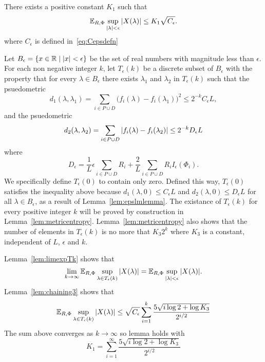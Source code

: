 \documentclass[journal]{IEEEtran}
\begin{document}
\begin{lemma}\label{lem:chaining2}
There exists a positive constant $K_1$ such that
\[
{\mathbb E}_{R,\Phi} \sup_{{\vert \lambda \vert} < \epsilon} {\left\vert  X(\lambda)  \right\vert} \leq K_1 \sqrt{C_\epsilon}.
\]
where $C_\epsilon$ is defined in~\eqref{eq:Cepsdefn}
\end{lemma}
\begin{IEEEproof}
Let $B_\epsilon = \{x \in {\mathbb R} \mid {\left\vert x \right\vert} < \epsilon\}$ be the set of real numbers with magnitude less than $\epsilon$.  For each non negative integer $k$, let $T_\epsilon(k)$ be a discrete subset of $B_\epsilon$ with the property that for every $\lambda \in B_\epsilon$ there exists $\lambda_1$ and $\lambda_2$ in $T_\epsilon(k)$ such that the psuedometric
\[
d_1(\lambda, \lambda_1) = \sum_{i \in P \cup D} \big( f_{i}(\lambda) - f_{i}(\lambda_1) \big)^2 \leq 2^{-k} C_\epsilon L,
\]
and the psuedometric
\[
d_2(\lambda, \lambda_2) = \sum_{i \in P \cup D} {\vert f_{i}(\lambda) - f_{i}(\lambda_2) \vert} \leq 2^{-k} D_\epsilon L
\]
where 
\begin{equation}\label{eq:Depsdefn}
D_\epsilon = \frac{1}{L}\epsilon\sum_{i\in P \cup D}R_i + \frac{2}{L}\sum_{i\in P \cup D}R_i I_{\epsilon}(\Phi_i).
\end{equation}
We specifically define $T_\epsilon(0)$ to contain only zero.  Defined this way, $T_\epsilon(0)$ satisfies the inequality above because $d_1(\lambda, 0) \leq C_\epsilon L $ and $d_2(\lambda, 0) \leq D_\epsilon L$ for all $\lambda \in B_\epsilon$, as a result of Lemma~\ref{lem:epslmlemma}.  
The existance of $T_\epsilon(k)$ for every positive integer $k$ will be proved by construction in Lemma~\ref{lem:metricentropy}.  Lemma~\ref{lem:metricentropy} also shows that the number of elements in $T_\epsilon(k)$ is no more that $K_3 2^k$ where $K_3$ is a constant, independent of $L$, $\epsilon$ and $k$.

Lemma~\ref{lem:limexpTk} shows that
\[
\lim_{k\rightarrow\infty}{\mathbb E}_{R,\Phi}\sup_{\lambda \in T_\epsilon(k)} {\vert X(\lambda) \vert} = {\mathbb E}_{R,\Phi} \sup_{{\vert \lambda \vert} < \epsilon} {\vert X(\lambda) \vert}.
\]
Lemma~\ref{lem:chaining3} shows that
\[
{\mathbb E}_{R,\Phi} \sup_{\lambda \in T_\epsilon(k)} {\vert X(\lambda) \vert} \leq \sqrt{C_\epsilon} \sum_{i=1}^k \frac{5\sqrt{i \log 2 + \log K_3}}{2^{i/2}}
\]
The sum above converges as $k\rightarrow\infty$ so lemma holds with
\[
K_1 = \sum_{i=1}^\infty \frac{5\sqrt{i \log 2 + \log K_3}}{2^{i/2}}
\]
\end{IEEEproof}
\end{document}
